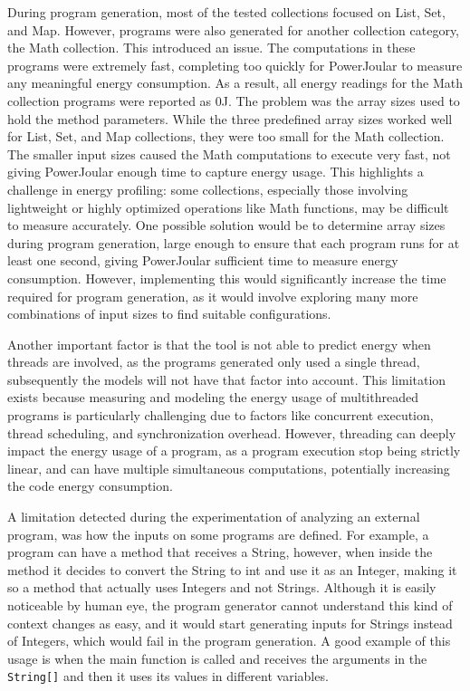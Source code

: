 During program generation, most of the tested collections focused on List, Set, and Map. However, programs were also generated for another collection category, the Math collection. This introduced an issue. The computations in these programs were extremely fast, completing too quickly for PowerJoular to measure any meaningful energy consumption. As a result, all energy readings for the Math collection programs were reported as 0J.
The problem was the array sizes used to hold the method parameters. While the three predefined array sizes worked well for List, Set, and Map collections, they were too small for the Math collection. The smaller input sizes caused the Math computations to execute very fast, not giving PowerJoular enough time to capture energy usage.
This highlights a challenge in energy profiling: some collections, especially those involving lightweight or highly optimized operations like Math functions, may be difficult to measure accurately. One possible solution would be to determine array sizes during program generation, large enough to ensure that each program runs for at least one second, giving PowerJoular sufficient time to measure energy consumption. However, implementing this would significantly increase the time required for program generation, as it would involve exploring many more combinations of input sizes to find suitable configurations.


Another important factor is that the tool is not able to predict energy when threads are involved, as the programs generated only used a single thread, subsequently the models will not have that factor into account. This limitation exists because measuring and modeling the energy usage of multithreaded programs is particularly challenging due to factors like concurrent execution, thread scheduling, and synchronization overhead. However, threading can deeply impact the energy usage of a program, as a program execution stop being strictly linear, and can have multiple simultaneous computations, potentially increasing the code energy consumption.

{\color{blue}
  A limitation detected during the experimentation of analyzing an external program, was how the inputs on some programs are defined. For example, a program can have a method that receives a String, however, when inside the method it decides to convert the String to int and use it as an Integer, making it so a method that actually uses Integers and not Strings. Although it is easily noticeable by human eye, the program generator cannot understand this kind of context changes as easy, and it would start generating inputs for Strings instead of Integers, which would fail in the program generation. A good example of this usage is when the main function is called and receives the arguments in the \texttt{String[]} and then it uses its values in different variables.
}





